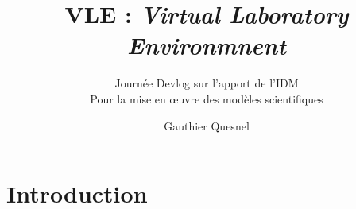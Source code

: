 \documentclass[xetex, compress, table, svgnames]{beamer}
\title[VLE]{VLE : \emph{Virtual Laboratory Environmnent}}
\subtitle[]{Journée Devlog sur l'apport de l'IDM\\Pour la mise en œuvre
des modèles scientifiques}
\author[Quesnel \emph{et al.}]{Gauthier Quesnel}
\institute[INRA MIA MIAT]{INRA - MIAT}
\date{}
\begin{document}
\begin{frame}
  \titlepage
\end{frame}

\section{Introduction}

\end{document}

